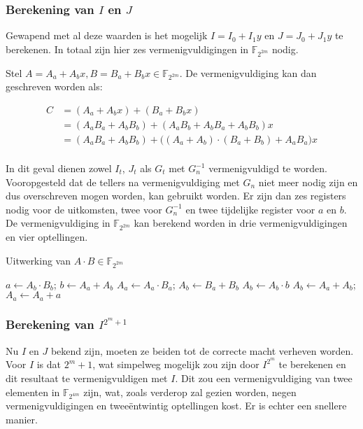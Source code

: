 \subsubsection{Berekening van $I$ en $J$}

Gewapend met al deze waarden is het mogelijk $I = I_0 + I_1 y$ en $J = J_0 + J_1 y$ te berekenen. In totaal zijn hier zes vermenigvuldigingen in $\mathbb{F}_{2^{2m}}$ nodig. 

Stel $A = A_a + A_b x, B = B_a + B_b x \in \mathbb{F}_{2^{2m}}$. De vermenigvuldiging kan dan geschreven worden als:

\[\begin{aligned}
C	&= (A_a + A_b x) + (B_a + B_b x)\\
	&= (A_a B_a + A_b B_b) + (A_a B_b + A_b B_a + A_b B_b)x\\
	&= (A_a B_a + A_b B_b) + \bigl( (A_a + A_b) \cdot (B_a + B_b) + A_a B_a \bigr) x\\
\end{aligned}\]

In dit geval dienen zowel $I_t$, $J_t$ als $G_t$ met $G_n^{-1}$ vermenigvuldigd te worden. Vooropgesteld dat de tellers na vermenigvuldiging met $G_n$ niet meer nodig zijn en dus overschreven mogen worden, kan  gebruikt worden. Er zijn dan zes registers nodig voor de uitkomsten, twee voor $G_n^{-1}$ en twee tijdelijke register voor $a$ en $b$. De vermenigvuldiging in $\mathbb{F}_{2^{2m}}$ kan berekend worden in drie vermenigvuldigingen en vier optellingen.

\begin{algorithm}[h]
	\caption{Uitwerking van $A \cdot B \in \mathbb{F}_{2^{2m}}$}
	\label{algoritme-implementatie-miller-f2m-mult}
	$a \leftarrow A_b \cdot B_b$; $b \leftarrow A_a + A_b$\;
	$A_a \leftarrow A_a \cdot B_a$; $A_b \leftarrow B_a + B_b$\;
	$A_b \leftarrow A_b \cdot b$\;
	$A_b \leftarrow A_a + A_b$; $A_a \leftarrow A_a + a$\;
\end{algorithm}

\subsubsection{Berekening van $I^{2^m + 1}$}

Nu $I$ en $J$ bekend zijn, moeten ze beiden tot de correcte macht verheven worden. Voor $I$ is dat $2^m + 1$, wat simpelweg mogelijk zou zijn door $I^{2^m}$ te berekenen en dit resultaat te vermenigvuldigen met $I$. Dit zou een vermenigvuldiging van twee elementen in $\mathbb{F}_{2^{4m}}$ zijn, wat, zoals verderop zal gezien worden, negen vermenigvuldigingen en twee\"entwintig optellingen kost. Er is echter een snellere manier.

